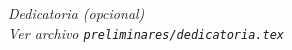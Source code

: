
\thispagestyle{empty}
{}

\hfill
\vfill

\begin{flushright}
    \itshape
    Dedicatoria (opcional) \\
    Ver archivo \texttt{preliminares/dedicatoria.tex}
\end{flushright}

\vfill

\cleardoublepage
\endinput
